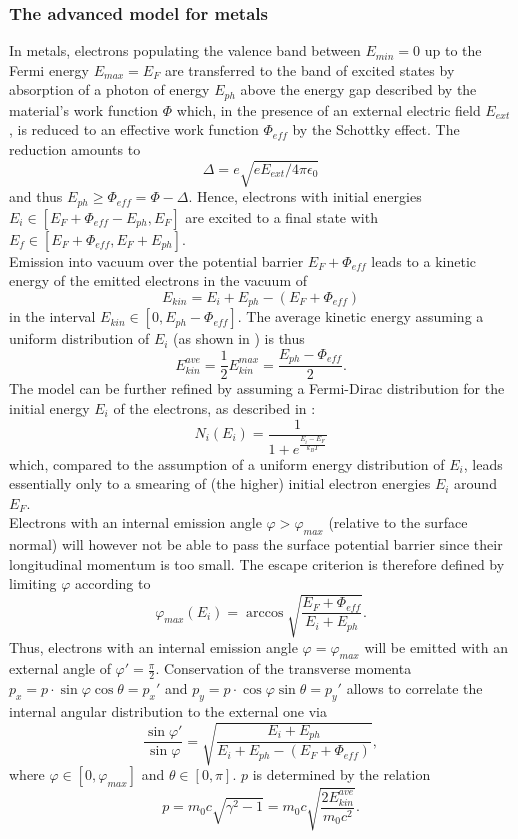 \documentclass{psi-note}    %
\begin{document}
{\subsubsection{The advanced model for metals}
In metals, electrons populating the valence band between $E_{min}=0$ up to the
Fermi energy $E_{max}=E_F$ are transferred to the band of excited states by
absorption of a photon of energy $E_{ph}$ above the energy gap described by the
material's work function $\Phi$ which, in the presence of an external electric
field $E_{ext}$, is reduced to an effective work function $\Phi_{eff}$ by the
Schottky effect. The reduction amounts to
%
$$\Delta = e \sqrt{e E_{ext} / 4 \pi \epsilon_0}$$
%
and thus $E_{ph} \geq \Phi_{eff} = \Phi - \Delta$. Hence, electrons with initial
energies $E_i \in [E_F + \Phi_{eff} - E_{ph}, E_F]$ are excited to a final state
with $E_f \in [E_F + \Phi_{eff}, E_F + E_{ph}]$. \\
Emission into vacuum over the potential barrier $E_F + \Phi_{eff}$ leads to a
kinetic energy of the emitted electrons in the vacuum of 
%
$$E_{kin} = E_i + E_{ph} - (E_F + \Phi_{eff})$$
%
in the interval $E_{kin} \in [0,E_{ph} - \Phi_{eff}]$. The average kinetic
energy assuming a uniform distribution of $E_i$ (as shown in \cite{ANGHEL}) is
thus
%
$$E_{kin}^{ave} = \frac{1}{2} E_{kin}^{max} = \frac{E_{ph} - \Phi_{eff}}{2} .$$
%
The model can be further refined by assuming a Fermi-Dirac distribution for the
initial energy $E_i$ of the electrons, as described in \cite{DAVE}: $$N_i(E_i) =
\frac{1}{1 + e^{\frac{E_i - E_F}{k_B T}}}$$ which, compared to the assumption of
a uniform energy distribution of $E_i$, leads essentially only to a smearing of
(the higher) initial electron energies $E_i$ around $E_F$.\\
Electrons with an internal emission angle $\varphi > \varphi_{max}$ (relative
to the surface normal) will however not be able to pass the surface potential
barrier since their longitudinal momentum is too small. The escape criterion is
therefore defined by limiting $\varphi$ according to 
%
$$\varphi_{max} (E_i) = \arccos \sqrt{\frac{E_F +\Phi_{eff}}{E_i + E_{ph}}} .$$
%
Thus, electrons with an internal emission angle $\varphi = \varphi_{max}$ will
be emitted with an external angle of $\varphi ' = \frac{\pi}{2}$. Conservation
of the transverse momenta $p_x = p \cdot \sin \varphi \cos \theta = p_x '$ and
$p_y = p \cdot \cos \varphi \sin \theta = p_y '$ allows to correlate the
internal angular distribution to the external one via 
%
$$\frac{\sin\varphi '}{\sin \varphi} = \sqrt{\frac{E_i + E_{ph}}{E_i + E_{ph} - (E_F + \Phi_{eff})}} ,$$
%
where $\varphi \in [0, \varphi_{max}]$ and $\theta \in [0, \pi]$. 
$p$ is determined by the relation
%
$$p= m_0 c \sqrt{\gamma^2 - 1} = m_0 c\sqrt{\frac{2 E_{kin}^{ave}}{m_0 c^2}} .$$ 


}
\end{document}
